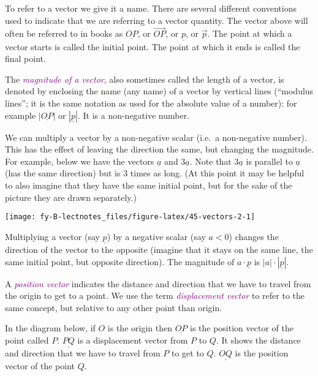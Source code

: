 \documentclass[
  english,
  11pt,
  oneside]{book}
\newcommand{\slide}{}
\theoremstyle{definition}
\theoremstyle{definition}
\theoremstyle{definition}
\theoremstyle{definition}
\theoremstyle{remark}
\begin{document}
To refer to a vector we give it a name. There are several different conventions used to indicate that we are referring to a vector quantity. The vector above will often be referred to in books as \(\underline{OP}\), or \(\overrightarrow{OP}\), or \(\underline p\), or \(\vec{p}\). The point at which a vector starts is called the initial point. The point at which it ends is called the final point.

\slide

The \textcolor{purple}{\em magnitude of a vector}, also sometimes called the length of a vector, is denoted by enclosing the name (any name) of a vector by vertical lines (``modulus lines''; it is the same notation as used for the absolute value of a number): for example \(|\underline{OP}|\) or \(|\underline{p}|\). It is a non-negative number.

\slide

We can multiply a vector by a non-negative scalar (i.e.~a non-negative number). This has the effect of leaving the direction the same, but changing the magnitude. For example, below we have the vectors \(\underline a\) and \(3\underline a\). Note that \(3\underline a\) is parallel to \(\underline a\) (has the same direction) but is \(3\) times as long. (At this point it may be helpful to also imagine that they have the same initial point, but for the sake of the picture they are drawn separately.)

\begin{center}\texttt{[image: fy-B-lectnotes\_files/figure-latex/45-vectors-2-1]} \end{center}
\slide

Multiplying a vector (say \(\underline{p}\)) by a negative scalar (say \(a<0\)) changes the direction of the vector to the opposite (imagine that it stays on the same line, the same initial point, but opposite direction). The magnitude of \(a\cdot\underline{p}\) is \(|a|\cdot |\underline{p}|\).

\slide

A \textcolor{purple}{\em position vector} indicates the distance and direction that we have to travel from the origin to get to a point. We use the term \textcolor{purple}{\em displacement vector} to refer to the same concept, but relative to any other point than origin.

In the diagram below, if \(O\) is the origin then \(\underline{OP}\) is the position vector of the point called \(P\). \(\underline{PQ}\) is a displacement vector from \(P\) to \(Q\). It shows the distance and direction that we have to travel from \(P\) to get to \(Q\). \(\underline{OQ}\) is the position vector of the point \(Q\).
\end{document}
